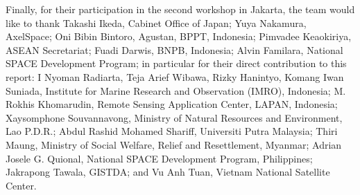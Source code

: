 Finally, for their participation in the second workshop in Jakarta, the team would like to thank Takashi Ikeda, Cabinet Office of Japan; Yuya Nakamura, AxelSpace; Oni Bibin Bintoro, Agustan, BPPT, Indonesia; Pimvadee Keaokiriya, ASEAN Secretariat; Fuadi Darwis, BNPB, Indonesia; Alvin Familara, National SPACE Development Program; in particular for their direct contribution to this report: I Nyoman Radiarta, Teja Arief Wibawa, Rizky Hanintyo, Komang Iwan Suniada, Institute for Marine Research and Observation (IMRO), Indonesia; M. Rokhis Khomarudin, Remote Sensing Application Center, LAPAN, Indonesia; Xaysomphone Souvannavong, Ministry of Natural Resources and Environment, Lao P.D.R.; Abdul Rashid Mohamed Shariff, Universiti Putra Malaysia; Thiri Maung, Ministry of Social Welfare, Relief and Resettlement, Myanmar; Adrian Josele G. Quional, National SPACE Development Program, Philippines; Jakrapong Tawala, GISTDA; and Vu Anh Tuan, Vietnam National Satellite Center.
